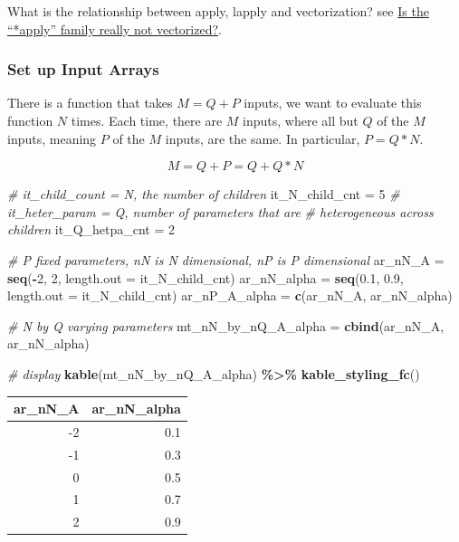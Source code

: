\documentclass[
]{book}
\newenvironment{Shaded}{\begin{snugshade}}{\end{snugshade}}
\newcommand{\CommentTok}[1]{\textcolor[rgb]{0.56,0.35,0.01}{\textit{#1}}}
\newcommand{\DataTypeTok}[1]{\textcolor[rgb]{0.13,0.29,0.53}{#1}}
\newcommand{\DecValTok}[1]{\textcolor[rgb]{0.00,0.00,0.81}{#1}}
\newcommand{\FloatTok}[1]{\textcolor[rgb]{0.00,0.00,0.81}{#1}}
\newcommand{\KeywordTok}[1]{\textcolor[rgb]{0.13,0.29,0.53}{\textbf{#1}}}
\newcommand{\NormalTok}[1]{#1}
\newcommand{\OperatorTok}[1]{\textcolor[rgb]{0.81,0.36,0.00}{\textbf{#1}}}
\newcommand{\StringTok}[1]{\textcolor[rgb]{0.31,0.60,0.02}{#1}}
\begin{document}
What is the relationship between apply, lapply and vectorization? see \href{https://stackoverflow.com/a/29006276/8280804}{Is the ``*apply'' family really not vectorized?}.

\hypertarget{set-up-input-arrays-2}{%
\subsubsection{Set up Input Arrays}\label{set-up-input-arrays-2}}

There is a function that takes \(M=Q+P\) inputs, we want to evaluate this function \(N\) times. Each time, there are \(M\) inputs, where all but \(Q\) of the \(M\) inputs, meaning \(P\) of the \(M\) inputs, are the same. In particular, \(P=Q*N\).

\[M = Q+P = Q + Q*N\]

\begin{Shaded}
\begin{Highlighting}[]
\CommentTok{\# it\_child\_count = N, the number of children}
\NormalTok{it\_N\_child\_cnt =}\StringTok{ }\DecValTok{5}
\CommentTok{\# it\_heter\_param = Q, number of parameters that are}
\CommentTok{\# heterogeneous across children}
\NormalTok{it\_Q\_hetpa\_cnt =}\StringTok{ }\DecValTok{2}

\CommentTok{\# P fixed parameters, nN is N dimensional, nP is P dimensional}
\NormalTok{ar\_nN\_A =}\StringTok{ }\KeywordTok{seq}\NormalTok{(}\OperatorTok{{-}}\DecValTok{2}\NormalTok{, }\DecValTok{2}\NormalTok{, }\DataTypeTok{length.out =}\NormalTok{ it\_N\_child\_cnt)}
\NormalTok{ar\_nN\_alpha =}\StringTok{ }\KeywordTok{seq}\NormalTok{(}\FloatTok{0.1}\NormalTok{, }\FloatTok{0.9}\NormalTok{, }\DataTypeTok{length.out =}\NormalTok{ it\_N\_child\_cnt)}
\NormalTok{ar\_nP\_A\_alpha =}\StringTok{ }\KeywordTok{c}\NormalTok{(ar\_nN\_A, ar\_nN\_alpha)}

\CommentTok{\# N by Q varying parameters}
\NormalTok{mt\_nN\_by\_nQ\_A\_alpha =}\StringTok{ }\KeywordTok{cbind}\NormalTok{(ar\_nN\_A, ar\_nN\_alpha)}

\CommentTok{\# display}
\KeywordTok{kable}\NormalTok{(mt\_nN\_by\_nQ\_A\_alpha) }\OperatorTok{\%\textgreater{}\%}
\StringTok{  }\KeywordTok{kable\_styling\_fc}\NormalTok{()}
\end{Highlighting}
\end{Shaded}

\begin{table}[!h]
\centering
\begin{tabular}{r|r}
\hline
ar\_nN\_A & ar\_nN\_alpha\\
\hline
\rowcolor{gray!6}  -2 & 0.1\\
\hline
-1 & 0.3\\
\hline
\rowcolor{gray!6}  0 & 0.5\\
\hline
1 & 0.7\\
\hline
\rowcolor{gray!6}  2 & 0.9\\
\hline
\end{tabular}
\end{table}
\end{document}
